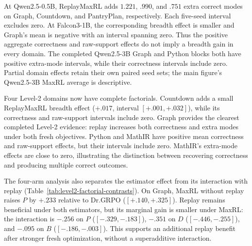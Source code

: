 \documentclass{article}
\newcommand{\1}{\mathbf 1}
\theoremstyle{remark}
\theoremstyle{definition}
\theoremstyle{plain}
\begin{document}
At Qwen2.5-0.5B, ReplayMaxRL adds $1.221$, $.990$, and $.751$ extra
correct modes on Graph, Countdown, and PantryPlan, respectively. Each
five-seed interval excludes zero. At Falcon3-1B, the corresponding breadth
effect is smaller and Graph's mean is negative with an interval spanning
zero. Thus the positive aggregate correctness and raw-support effects do
not imply a breadth gain in every domain. The completed Qwen2.5-3B Graph
and Python blocks both have positive extra-mode intervals, while their
correctness intervals include zero. Partial domain effects retain their
own paired seed sets; the main figure's Qwen2.5-3B MaxRL average is descriptive.

\begin{table}[H]
  \centering
  \caption{\textbf{Replay effects on the harder Level-2 tasks at pass 8.}
  MaxRL and Dr.GRPO identify the fresh objective; each effect is its replay
  variant minus the corresponding objective without replay. Each row uses
  its own pairwise intersection, which can exceed the four-method
  intersection. Brackets give paired Student-$t$ intervals for $\Delta B$
  only when all five registered pairs are available.}
  \label{tab:current-e119}
  \scriptsize
  \setlength{\tabcolsep}{3pt}
\end{table}

Four Level-2 domains now have complete factorials. Countdown adds a small
ReplayMaxRL breadth effect ($+.017$, interval $[+.001,+.032]$), while its
correctness and raw-support intervals include zero. Graph provides the
clearest completed Level-2 evidence: replay increases
both correctness and extra modes under both fresh objectives. Python and
MathIR have positive mean correctness and raw-support effects, but their
intervals include zero. MathIR's extra-mode effects are close to zero,
illustrating the distinction between recovering correctness and producing
multiple correct outcomes.

The four-arm analysis also separates the estimator effect from its
interaction with replay (Table~\ref{tab:level2-factorial-contrasts}). On
Graph, MaxRL without replay raises $P$ by $+.233$ relative to Dr.GRPO
($[+.140,+.325]$). Replay remains beneficial under both estimators, but its
marginal gain is smaller under MaxRL: the interaction is $-.256$ on $P$
($[-.329,-.183]$), $-.351$ on $D$ ($[-.446,-.255]$), and $-.095$ on $B$
($[-.186,-.003]$). This supports an additional replay benefit after stronger
fresh optimization, without a superadditive interaction.
\end{document}
